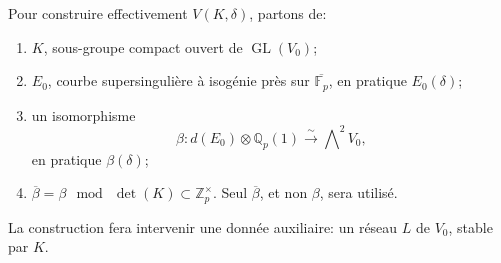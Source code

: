 \documentclass[11pt]{article}
\newcommand{\Fp}{\mathbb{F}_{p}}
\newcommand{\Qp}{\mathbb{Q}_{p}}
\newcommand{\Zp}{\mathbb{Z}_{p}}
\newcommand{\GL}{\operatorname{GL}}
\begin{document}
Pour construire effectivement \(V(K,\delta)\), partons de:
\begin{enumerate}[label=(\alph*)]
\item \(K\), sous-groupe compact ouvert de \(\GL(V_0)\);
\item \(E_0\), courbe supersingulière à isogénie près sur \(\overline{\Fp}\), en pratique \(E_0(\delta)\);
\item un isomorphisme
\[
\beta:d(E_0)\otimes\Qp(1)\xrightarrow{\sim}\bigwedge\nolimits^2V_0,
\]
en pratique \(\beta(\delta)\);
\item \(\overline{\beta}=\beta\ \bmod\ \det(K)\subset\Zp^\times\). Seul \(\overline{\beta}\), et non \(\beta\), sera utilisé.
\end{enumerate}
La construction fera intervenir une donnée auxiliaire: un réseau \(L\) de \(V_0\), stable par \(K\).
\end{document}
